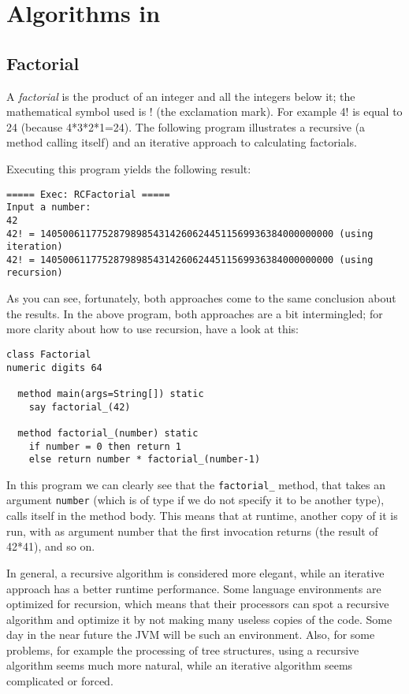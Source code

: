 {\chapter{Algorithms in \nr}{}
\section{Factorial}
A \emph{factorial} is the product of an integer and all the integers
below it; the mathematical symbol used is ! (the exclamation mark). For
example 4! is equal to 24 (because 4*3*2*1=24). The
following program illustrates a recursive (a method calling itself)
and an iterative approach to calculating factorials.

Executing this program yields the following result:
\begin{verbatim}
===== Exec: RCFactorial =====
Input a number: 
42
42! = 1405006117752879898543142606244511569936384000000000 (using iteration)
42! = 1405006117752879898543142606244511569936384000000000 (using recursion)
\end{verbatim}
As you can see, fortunately, both approaches come to the same
conclusion about the results. In the above program, both
approaches are a bit intermingled; for more clarity about how to use
recursion, have a look at this:
\begin{lstlisting}[label=factorialrecursive, caption=Factorial Recursive]
class Factorial
numeric digits 64

  method main(args=String[]) static
    say factorial_(42)

  method factorial_(number) static
    if number = 0 then return 1
    else return number * factorial_(number-1)

\end{lstlisting}
In this program we can clearly see that the \texttt{factorial\_} method, that
takes an argument \texttt{number} (which is of type \Rexx{} if we do not
specify it to be another type), calls itself in the method body. This
means that at runtime, another copy of it is run, with as argument
number that the first invocation returns (the result of 42*41), and so
on.

In general, a recursive algorithm is considered more elegant, while an
iterative approach has a better runtime performance. Some language
environments are optimized for recursion, which means that their
processors can spot a recursive algorithm and optimize it by not
making many useless copies of the code. Some day in the near future
the JVM will be such an environment. Also, for some problems, for example
the processing of tree structures, using a recursive algorithm seems
much more natural, while an iterative algorithm seems complicated or forced.
}
